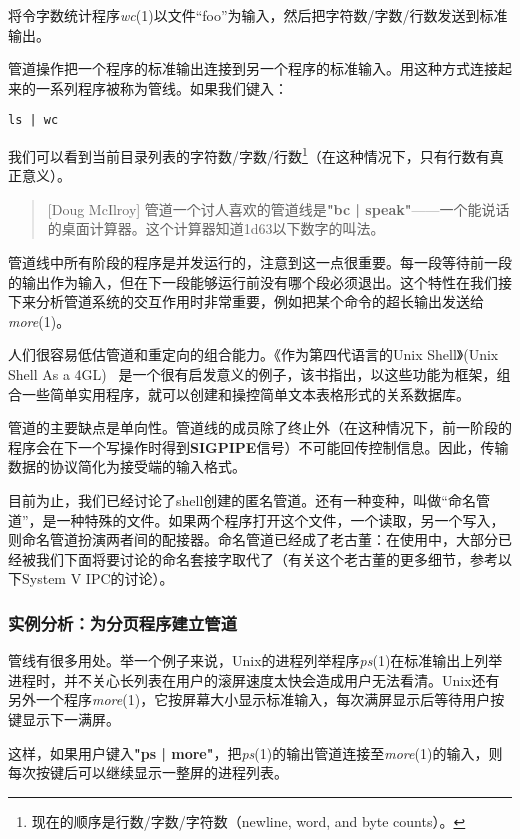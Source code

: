 \documentclass[12pt,oneside]{ctexbook}
\begin{document}
\begin{common-format}
将令字数统计程序\textit{wc}(1)以文件“foo”为输入，然后把字符数/字数/行数发送到标准输出。

管道操作把一个程序的标准输出连接到另一个程序的标准输入。用这种方式连接起来的一系列程序被称为管线。如果我们键入：
\begin{Verbatim}
ls | wc
\end{Verbatim}


我们可以看到当前目录列表的字符数/字数/行数\footnote{现在的顺序是行数/字数/字符数（newline, word, and byte counts）。}（在这种情况下，只有行数有真正意义）。

\begin{quote}[Doug McIlroy]
管道一个讨人喜欢的管道线是\textbf{"bc | speak"}——一个能说话的桌面计算器。这个计算器知道\num{1d63}以下数字的叫法。
\end{quote}

管道线中所有阶段的程序是并发运行的，注意到这一点很重要。每一段等待前一段的输出作为输入，但在下一段能够运行前没有哪个段必须退出。这个特性在我们接下来分析管道系统的交互作用时非常重要，例如把某个命令的超长输出发送给\textit{more}(1)。

人们很容易低估管道和重定向的组合能力。《作为第四代语言的Unix Shell》(Unix Shell As a 4GL) ~\cite{Schaffer-Wolf}是一个很有启发意义的例子，该书指出，以这些功能为框架，组合一些简单实用程序，就可以创建和操控简单文本表格形式的关系数据库。

管道的主要缺点是单向性。管道线的成员除了终止外（在这种情况下，前一阶段的程序会在下一个写操作时得到\textbf{SIGPIPE}信号）不可能回传控制信息。因此，传输数据的协议简化为接受端的输入格式。

目前为止，我们已经讨论了shell创建的匿名管道。还有一种变种，叫做“命名管道”，是一种特殊的文件。如果两个程序打开这个文件，一个读取，另一个写入，则命名管道扮演两者间的配接器。命名管道已经成了老古董：在使用中，大部分已经被我们下面将要讨论的命名套接字取代了（有关这个老古董的更多细节，参考以下System V IPC的讨论）。


\subsubsection{实例分析：为分页程序建立管道}
管线有很多用处。举一个例子来说，Unix的进程列举程序\textit{ps}(1)在标准输出上列举进程时，并不关心长列表在用户的滚屏速度太快会造成用户无法看清。Unix还有另外一个程序\textit{more}(1)，它按屏幕大小显示标准输入，每次满屏显示后等待用户按键显示下一满屏。

这样，如果用户键入\textbf{"ps | more"}，把\textit{ps}(1)的输出管道连接至\textit{more}(1)的输入，则每次按键后可以继续显示一整屏的进程列表。


\end{common-format}
\end{document}
